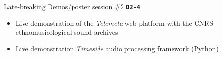 \documentclass[final, hyperref, table]{beamer}
\begin{document}
\begin{frame}
\begin{columns}
  \begin{block}{Late-breaking Demos/poster session \#2 \texttt{\textbf{D2-4}}}
    \begin{itemize}
       \item Live demonstration of the \emph{Telemeta} web platform with
      the CNRS \alert{ethnomusicological sound archives}
    \item Live demonstration \emph{Timeside} audio processing framework (Python)
    \end{itemize}
  \end{block}

\end{columns}
\end{frame}
\end{document}
